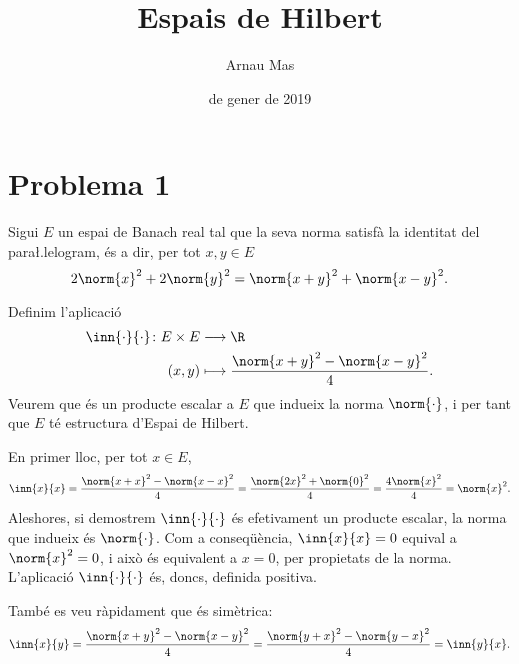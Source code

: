 \documentclass[12pt]{article}
\title{\sffamily {\bfseries Entrega 3:} Espais de Hilbert}
\author{\sffamily Arnau Mas}
\date{\sffamily 10 de gener de 2019}
\begin{document}
\maketitle
\section*{Problema 1}
Sigui \( E \) un espai de Banach real tal que la seva norma satisfà la identitat del
para\l.lelogram, és a dir, per tot \( x,y \in E \)
\begin{equation*}
	2\norm{x}^2 + 2\norm{y}^2 = \norm{x+y}^2 + \norm{x-y}^2.
\end{equation*}

Definim l'aplicació
\begin{align*}
	\inn{\cdot}{\cdot} \colon E \times E & \longrightarrow \R \\
	(x,y) & \longmapsto \frac{\norm{x+y}^2 - \norm{x-y}^2}{4}.
\end{align*}
Veurem que és un producte escalar a \( E \) que indueix la norma \(
\norm{\cdot} \), i per tant que \( E \) té estructura d'Espai de Hilbert.

En primer lloc, per tot \( x \in E \),
\begin{equation*}
	\inn{x}{x} = \frac{\norm{x+x}^2 - \norm{x-x}^2}{4} = \frac{\norm{2x}^2 + \norm{0}^2}{4}
	= \frac{4\norm{x}^2}{4} = \norm{x}^2.
\end{equation*}
Aleshores, si demostrem \( \inn{\cdot}{\cdot} \) és efetivament un producte escalar, la
norma que indueix és \( \norm{\cdot} \). Com a conseqüència, \( \inn{x}{x} = 0 \)
equival a \( \norm{x}^2 = 0 \), i això és equivalent a \( x = 0 \), per propietats de la
norma. L'aplicació \( \inn{\cdot}{\cdot} \) és, doncs, definida positiva.

També es veu ràpidament que és simètrica:
\begin{equation*}
	\inn{x}{y} = \frac{\norm{x+y}^2 - \norm{x-y}^2}{4} = \frac{\norm{y+x}^2 - \norm{y-x}^2}{4} = \inn{y}{x}.
\end{equation*}
\end{document}
